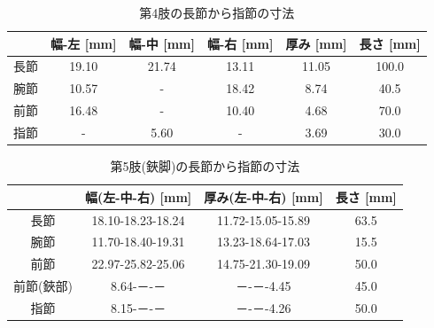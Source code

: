 %
\begin{table}[htbp]
  \centering
  \caption{第4肢の長節から指節の寸法}
  \label{tab:4setu}
  \vspace{-3mm}
  \begin{tabular}{|l|c|c|c|c|c|}
  \hline
     & \multicolumn{1}{l|}{幅-左 [mm]} & \multicolumn{1}{l|}{幅-中 [mm]} & \multicolumn{1}{l|}{幅-右 [mm]} & \multicolumn{1}{l|}{厚み [mm]} & \multicolumn{1}{l|}{長さ [mm]} \\ \hline
  長節 & 19.10                       & 21.74                       & 13.11                       & 11.05                       & 100.0                       \\ \hline
  腕節 & 10.57                       & -                           & 18.42                       & 8.74                        & 40.5                        \\ \hline
  前節 & 16.48                       & -                           & 10.40                       & 4.68                        & 70.0                        \\ \hline
  指節 & -                           & 5.60                        & -                           & 3.69                        & 30.0                        \\ \hline
  \end{tabular}
  \end{table}
  \begin{table}[htbp]
    \centering
    \caption{第5肢(鋏脚)の長節から指節の寸法}
    \label{tab:5setu}
    \vspace{-3mm}
    \begin{tabular}{|c|c|c|c|}
    \hline
    \multicolumn{1}{|l|}{} & \multicolumn{1}{l|}{幅(左-中-右) {[}mm{]}} & \multicolumn{1}{l|}{厚み(左-中-右) {[}mm{]}} & \multicolumn{1}{l|}{長さ [mm]} \\ \hline
    長節                     & 18.10-18.23-18.24                     & 11.72-15.05-15.89                      & 63.5                        \\ \hline
    腕節                     & 11.70-18.40-19.31                     & 13.23-18.64-17.03                      & 15.5                        \\ \hline
    前節                     & 22.97-25.82-25.06                     & 14.75-21.30-19.09                      & 50.0                        \\ \hline
    前節(鋏部)                 & 8.64-－-－                              & －-－-4.45                          & 45.0                      \\ \hline
    指節                     & 8.15-－-－                              & －-－-4.26                               & 50.0                        \\ \hline
    \end{tabular}
  \end{table}
